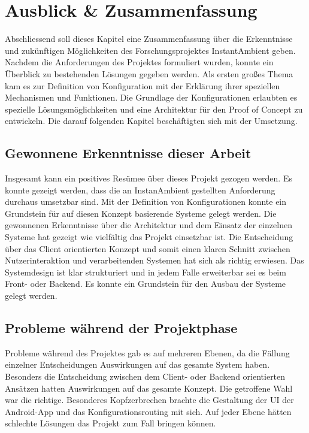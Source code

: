 \chapter{Ausblick \& Zusammenfassung}
Abschliessend soll dieses Kapitel eine Zusammenfassung über die Erkenntnisse und zukünftigen Möglichkeiten des Forschungsprojektes InstantAmbient geben. 
Nachdem die Anforderungen des Projektes formuliert wurden, konnte ein Überblick zu bestehenden Lösungen gegeben werden. Als ersten großes Thema kam es zur Definition von Konfiguration mit der Erklärung ihrer speziellen Mechanismen und Funktionen. Die Grundlage der Konfigurationen erlaubten es spezielle Lösungsmöglichkeiten und eine Architektur für den Proof of Concept zu entwickeln. Die darauf folgenden Kapitel beschäftigten sich mit der Umsetzung.

\section{Gewonnene Erkenntnisse dieser Arbeit}
Insgesamt kann ein positives Resümee über dieses Projekt gezogen werden. Es konnte gezeigt werden, dass die an InstanAmbient gestellten Anforderung durchaus umsetzbar sind. Mit der Definition von Konfigurationen konnte ein Grundstein für auf diesen Konzept basierende Systeme gelegt werden. Die gewonnenen Erkenntnisse über die Architektur und dem Einsatz der einzelnen Systeme hat gezeigt wie vielfältig das Projekt einsetzbar ist. Die Entscheidung über das Client orientierten Konzept und somit einen klaren Schnitt zwischen Nutzerinteraktion und verarbeitenden Systemen hat sich als richtig erwiesen. Das Systemdesign ist klar strukturiert und in jedem Falle erweiterbar sei es beim Front- oder Backend. Es konnte ein Grundstein für den Ausbau der Systeme gelegt werden.

\section{Probleme während der Projektphase}
Probleme während des Projektes gab es auf mehreren Ebenen, da die Fällung einzelner Entscheidungen Auswirkungen auf das gesamte System haben. Besonders die Entscheidung zwischen dem Client- oder Backend orientierten Ansätzen hatten Auswirkungen auf das gesamte Konzept. Die getroffene Wahl war die richtige. Besonderes Kopfzerbrechen brachte die Gestaltung der UI der Android-App und das Konfigurationsrouting mit sich. Auf jeder Ebene hätten schlechte Lösungen das Projekt zum Fall bringen können. 

